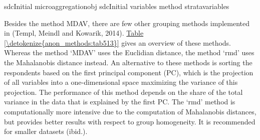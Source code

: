 \documentclass[letterpaper,10pt,english]{sphinxmanual}
\begin{document}
\def\sphinxLiteralBlockLabel{\label{\detokenize{anon_methods:code518}}}
%
\begin{sphinxVerbatim}[commandchars=\\\{\},numbers=left,firstnumber=1,stepnumber=1]
 sdcInitial  microaggregationobj  sdcInitial variables     method   strata\PYGZus{}variables  
\end{sphinxVerbatim}

Besides the method MDAV, there are few other grouping methods
implemented in  (Templ, Meindl and Kowarik, 2014). \hyperref[\detokenize{anon_methods:tab513}]{Table \ref{\detokenize{anon_methods:tab513}}}
gives an overview of these methods. Whereas the method ‘MDAV’ uses the
Euclidian distance, the method ‘rmd’ uses the Mahalanobis distance
instead. An alternative to these methods is sorting the respondents
based on the first principal component (PC), which is the projection of
all variables into a one-dimensional space maximizing the variance of
this projection. The performance of this method depends on the share of
the total variance in the data that is explained by the first PC. The
‘rmd’ method is computationally more intensive due to the computation of
Mahalanobis distances, but provides better results with respect to group
homogeneity. It is recommended for smaller datasets (ibid.).
\end{document}

